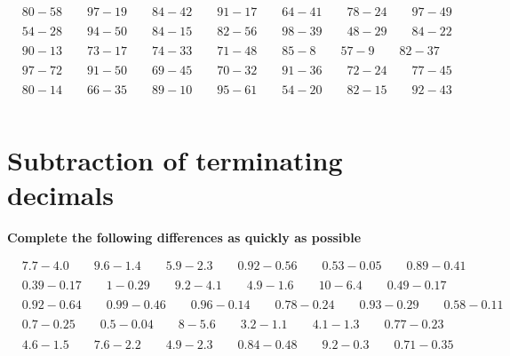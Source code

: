 \documentclass{article}
\begin{document}
\(\begin{aligned}
	&80-58 \qquad 97-19 \qquad 84-42 \qquad 91-17 \qquad 64-41 \qquad 78-24 \qquad 97-49 \\\\
	&54-28 \qquad 94-50 \qquad 84-15 \qquad 82-56 \qquad 98-39 \qquad 48-29 \qquad 84-22 \\\\
	&90-13 \qquad 73-17 \qquad 74-33 \qquad 71-48 \qquad 85-8  \qquad 57-9  \qquad 82-37 \\\\
	&97-72 \qquad 91-50 \qquad 69-45 \qquad 70-32 \qquad 91-36 \qquad 72-24 \qquad 77-45 \\\\
	&80-14 \qquad 66-35 \qquad 89-10 \qquad 95-61 \qquad 54-20 \qquad 82-15 \qquad 92-43 \\\\
\end{aligned}\)


\section{Subtraction of terminating decimals}

\textbf{Complete the following differences as quickly as possible}
\bigskip

\(\begin{aligned}
	&7.7-4.0 \qquad 9.6-1.4 \qquad 5.9-2.3 \qquad 0.92-0.56 \qquad 0.53-0.05 \qquad 0.89-0.41 \\\\
	&0.39-0.17 \qquad 1-0.29 \qquad 9.2-4.1 \qquad 4.9-1.6 \qquad 10-6.4 \qquad 0.49-0.17 \\\\
	&0.92-0.64 \qquad 0.99-0.46 \qquad 0.96-0.14 \qquad 0.78-0.24 \qquad 0.93-0.29 \qquad 0.58-0.11 \\\\
	&0.7-0.25 \qquad 0.5-0.04 \qquad 8-5.6 \qquad 3.2-1.1  \qquad 4.1-1.3 \qquad 0.77-0.23  \\\\
	&4.6-1.5 \qquad 7.6-2.2 \qquad 4.9-2.3 \qquad 0.84-0.48 \qquad 9.2-0.3 \qquad 0.71-0.35 \\\\
\end{aligned}\)
\end{document}
